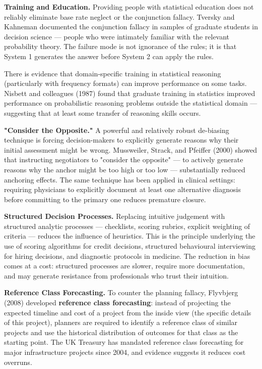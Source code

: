 \documentclass[12pt, letterpaper]{article}
\begin{document}
\textbf{Training and Education.} Providing people with statistical education does not reliably eliminate base rate neglect or the conjunction fallacy. Tversky and Kahneman documented the conjunction fallacy in samples of graduate students in decision science --- people who were intimately familiar with the relevant probability theory. The failure mode is not ignorance of the rules; it is that System 1 generates the answer before System 2 can apply the rules.

There is evidence that domain-specific training in statistical reasoning (particularly with frequency formats) can improve performance on some tasks. Nisbett and colleagues (1987) found that graduate training in statistics improved performance on probabilistic reasoning problems outside the statistical domain --- suggesting that at least some transfer of reasoning skills occurs.

\textbf{"Consider the Opposite."} A powerful and relatively robust de-biasing technique is forcing decision-makers to explicitly generate reasons why their initial assessment might be wrong. Mussweiler, Strack, and Pfeiffer (2000) showed that instructing negotiators to "consider the opposite" --- to actively generate reasons why the anchor might be too high or too low --- substantially reduced anchoring effects. The same technique has been applied in clinical settings: requiring physicians to explicitly document at least one alternative diagnosis before committing to the primary one reduces premature closure.

\textbf{Structured Decision Processes.} Replacing intuitive judgement with structured analytic processes --- checklists, scoring rubrics, explicit weighting of criteria --- reduces the influence of heuristics. This is the principle underlying the use of scoring algorithms for credit decisions, structured behavioural interviewing for hiring decisions, and diagnostic protocols in medicine. The reduction in bias comes at a cost: structured processes are slower, require more documentation, and may generate resistance from professionals who trust their intuition.

\textbf{Reference Class Forecasting.} To counter the planning fallacy, Flyvbjerg (2008) developed \textbf{reference class forecasting}: instead of projecting the expected timeline and cost of a project from the inside view (the specific details of this project), planners are required to identify a reference class of similar projects and use the historical distribution of outcomes for that class as the starting point. The UK Treasury has mandated reference class forecasting for major infrastructure projects since 2004, and evidence suggests it reduces cost overruns.
\end{document}
